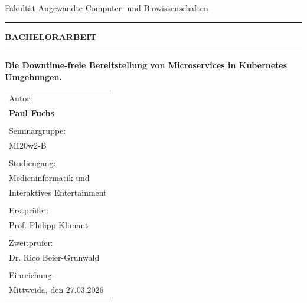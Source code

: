 \documentclass[
12pt,
a4paper,
twoside,
openright
]{report}
\begin{document}
	
	
	
	\thispagestyle{empty}
	\begin{titlepage}	
		\raggedleft
		\vspace*{2cm}
		
		{\large Fakultät Angewandte Computer- und Biowissenschaften\par}
		
		\vspace{1cm}
		\hrule
		\vspace{0.5cm}
		{\huge \textbf{BACHELORARBEIT}\par}
		\vspace{0.5cm}
		\hrule
		\vspace{2cm}
		
		{\LARGE \textbf{Die Downtime-freie Bereitstellung von Microservices in Kubernetes Umgebungen.}\\[1.5cm]}
		\vfill
		\raggedleft
		\begin{tabular}{l}
			Autor: \\ \textbf {Paul Fuchs} \\ \\
			Seminargruppe: \\ MI20w2-B \\ \\
			Studiengang: \\ Medieninformatik und  \\ Interaktives Entertainment \\ \\
			Erstprüfer: \\ Prof. Philipp Klimant  \\ \\
			Zweitprüfer: \\ Dr. Rico Beier-Grunwald \\ \\
			Einreichung: \\ Mittweida, den 27.03.2026
		\end{tabular}
	\end{titlepage}
	
\end{document}
